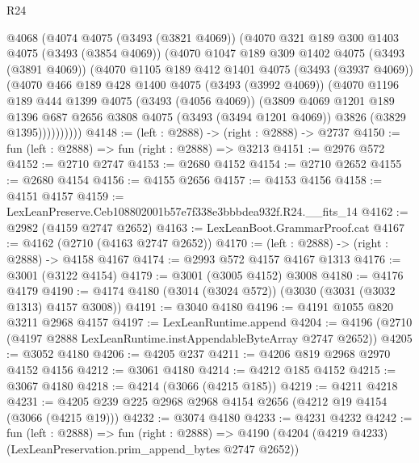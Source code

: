\begin{lexlean}{R24}
\begin{coremodule}
      @4068
        (@4074
          @4075
          (@3493 (@3821 @4069))
          (@4070
            @321
            @189
            @300
            @1403
            @4075
            (@3493 (@3854 @4069))
            (@4070
              @1047
              @189
              @309
              @1402
              @4075
              (@3493 (@3891 @4069))
              (@4070
                @1105
                @189
                @412
                @1401
                @4075
                (@3493 (@3937 @4069))
                (@4070
                  @466
                  @189
                  @428
                  @1400
                  @4075
                  (@3493 (@3992 @4069))
                  (@4070
                    @1196
                    @189
                    @444
                    @1399
                    @4075
                    (@3493 (@4056 @4069))
                    (@3809
                      @4069
                      @1201
                      @189
                      @1396
                      @687
                      @2656
                      @3808
                      @4075
                      (@3493 (@3494 @1201 @4069))
                      @3826
                      (@3829 @1395))))))))))
@4148 := (left : @2888) -> (right : @2888) -> @2737
@4150 := fun (left : @2888) => fun (right : @2888) => @3213
@4151 := @2976 @572
@4152 := @2710 @2747
@4153 := @2680 @4152
@4154 := @2710 @2652
@4155 := @2680 @4154
@4156 := @4155 @2656
@4157 := @4153 @4156
@4158 := @4151 @4157
@4159 := LexLeanPreserve.Ceb108802001b57e7f338e3bbbdea932f.R24.__fits_14
@4162 := @2982 (@4159 @2747 @2652)
@4163 := LexLeanBoot.GrammarProof.cat
@4167 := @4162 (@2710 (@4163 @2747 @2652))
@4170 := (left : @2888) -> (right : @2888) -> @4158 @4167
@4174 := @2993 @572 @4157 @4167 @1313
@4176 := @3001 (@3122 @4154)
@4179 := @3001 (@3005 @4152) @3008
@4180 := @4176 @4179
@4190 := @4174 @4180 (@3014 (@3024 @572)) (@3030 (@3031 (@3032 @1313) @4157 @3008))
@4191 := @3040 @4180
@4196 := @4191 @1055 @820 @3211 @2968 @4157
@4197 := LexLeanRuntime.append
@4204 := @4196 (@2710 (@4197 @2888 LexLeanRuntime.instAppendableByteArray @2747 @2652))
@4205 := @3052 @4180
@4206 := @4205 @237
@4211 := @4206 @819 @2968 @2970 @4152 @4156
@4212 := @3061 @4180
@4214 := @4212 @185 @4152
@4215 := @3067 @4180
@4218 := @4214 (@3066 (@4215 @185))
@4219 := @4211 @4218
@4231 := @4205 @239 @225 @2968 @2968 @4154 @2656 (@4212 @19 @4154 (@3066 (@4215 @19)))
@4232 := @3074 @4180
@4233 := @4231 @4232
@4242 := fun (left : @2888) =>
  fun (right : @2888) =>
  @4190 (@4204 (@4219 @4233) (LexLeanPreservation.prim_append_bytes @2747 @2652))

\end{coremodule}
\end{lexlean}
